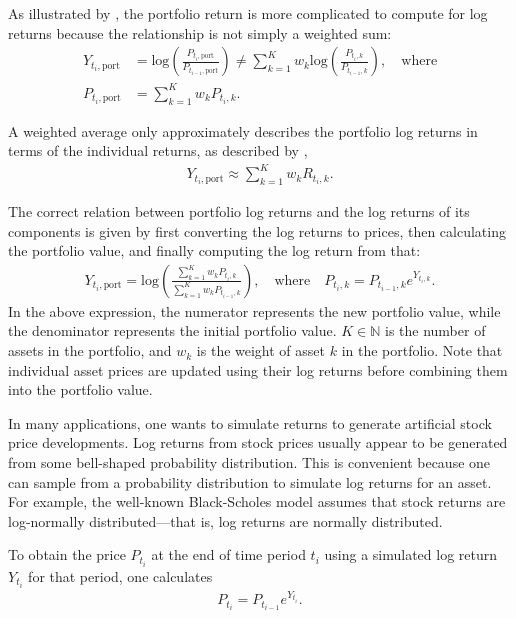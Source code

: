 As illustrated by \citet[p.~4]{Danielsson2011}, the portfolio return is more complicated to compute for log returns because the relationship is not simply a weighted sum:
\begin{align*}
        Y_{t_i,\mathrm{port}} &= \mathrm{log}\left(\frac{P_{t_i,\mathrm{port}}}{P_{t_{i-1},\mathrm{port}}}\right) \neq  \sum_{k=1}^K w_k \mathrm{log}\left(\frac{P_{t_i,k}}{P_{t_{i-1},k}}\right), \quad \text{where} \\
        P_{t_i,\mathrm{port}} &= \sum_{k=1}^K w_k P_{t_i,k}.
\end{align*}

A weighted average only approximately describes the portfolio log returns in terms of the individual returns, as described by ,
\begin{align*}
    Y_{t_i,\mathrm{port}} \approx \sum_{k=1}^K w_k R_{t_i,k}.
\end{align*}

The correct relation between portfolio log returns and the log returns of its components is given by first converting the log returns to prices, then calculating the portfolio value, and finally computing the log return from that:
\begin{align*}
    Y_{t_i,\mathrm{port}} = \mathrm{log} \left( \frac{\sum_{k=1}^K w_k P_{t_i,k}}{\sum_{k=1}^K w_k P_{t_{i-1},k}} \right), \quad \text{where} \quad P_{t_i,k} = P_{t_{i-1},k} e^{Y_{t_i,k}}.
\end{align*}
In the above expression, the numerator represents the new portfolio value, while the denominator represents the initial portfolio value. $K \in \mathbb{N}$ is the number of assets in the portfolio, and $w_k$ is the weight of asset $k$ in the portfolio. Note that individual asset prices are updated using their log returns before combining them into the portfolio value. 

In many applications, one wants to simulate returns to generate artificial stock price developments. Log returns from stock prices usually appear to be generated from some bell-shaped probability distribution. This is convenient because one can sample from a probability distribution to simulate log returns for an asset. For example, the well-known Black-Scholes model assumes that stock returns are log-normally distributed—that is, log returns are normally distributed. 

To obtain the price $P_{t_i}$ at the end of time period $t_i$ using a simulated log return $Y_{t_i}$ for that period, one calculates 
\begin{align*}
    P_{t_i} = P_{t_{i-1}} e^{Y_{t_i}}.
\end{align*}

